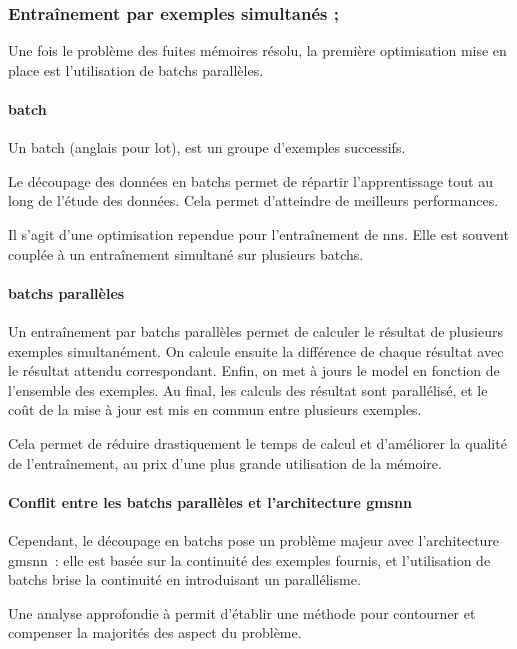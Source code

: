 \subsubsection{Entraînement par exemples simultanés ; } \label{subsec:optibatch}
Une fois le problème des fuites mémoires résolu, la première optimisation mise en place est l'utilisation de \glspl{batch} parallèles.

\paragraph{\gls{batch}}
Un \gls{batch} (anglais pour lot), est un groupe d'exemples successifs.

Le découpage des données en \glspl{batch} permet de répartir l'apprentissage tout au long de l'étude des données.
Cela permet d'atteindre de meilleurs performances.

Il s'agit d'une optimisation rependue pour l'entraînement de \glspl{nn}. %
Elle est souvent couplée à un entraînement simultané sur plusieurs \glspl{batch}.

\paragraph{\Glspl{batch} parallèles}
Un entraînement par \glspl{batch} parallèles permet de calculer le résultat de plusieurs exemples simultanément.
On calcule ensuite la différence de chaque résultat avec le résultat attendu correspondant.
Enfin, on met à jours le \gls{model} en fonction de l'ensemble des exemples.
Au final, les calculs des résultat sont parallélisé, et le coût de la mise à jour est mis en commun entre plusieurs exemples.

Cela permet de réduire drastiquement le temps de calcul et d'améliorer la qualité de l'entraînement, au prix d'une plus grande utilisation de la mémoire.

\paragraph{Conflit entre les \glspl{batch} parallèles et l'architecture \gls{gmsnn}}
Cependant, le découpage en \glspl{batch} pose un problème majeur avec l'architecture \gls{gmsnn}~: elle est basée sur la continuité des exemples fournis, et l'utilisation de \glspl{batch} brise la continuité en introduisant un parallélisme.

Une analyse approfondie à permit d'établir une méthode pour contourner et compenser la majorités des aspect du problème.

